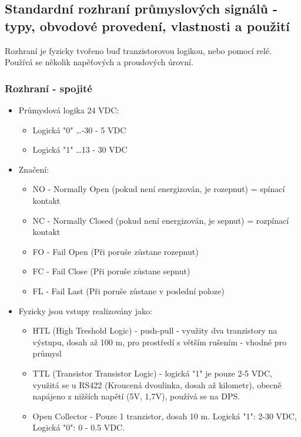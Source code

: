\subsection{Standardní rozhraní průmyslových signálů - typy, obvodové provedení, vlastnosti a použití}
Rozhraní je fyzicky tvořeno buď tranzistorovou logikou, nebo pomocí relé. Používá se několik napěťových a proudových úrovní.
\subsubsection*{Rozhraní - spojité}
\begin{itemize}
  \item Průmyslová logika 24 VDC: \begin{itemize}
    \item Logická "0" \dots -30 - 5 VDC
    \item Logická "1" \dots 13 - 30 VDC
  \end{itemize}
  \item Značení: \begin{itemize}
    \item NO - Normally Open (pokud není energizován, je rozepnut) = spínací kontakt
    \item NC - Normally Closed (pokud není energizován, je sepnut) = rozpínací kontakt
    \item FO - Fail Open (Při poruše zůstane rozepnut)
    \item FC - Fail Close (Při poruše zůstane sepnut)
    \item FL - Fail Last (Při poruše zůstane v poslední poloze)
  \end{itemize}
  	\item Fyzicky jsou vstupy realizovány jako: \begin{itemize}
      \item HTL (High Treshold Logic) - push-pull - využity dva tranzistory na výstupu, dosah až 100 m, pro prostředí s větším rušením - vhodné pro průmysl
      \item TTL (Transistor Transistor Logic) - logická "1" je pouze 2-5 VDC, využitá se u RS422 (Kroucená dvoulinka, dosah až kilometr), obecně napájeno z nižších napětí (5V, 1,7V), používá se na DPS.
      \item Open Collector - Pouze 1 tranzistor, dosah 10 m. Logická "1": 2-30 VDC, Logická "0": 0 - 0.5 VDC.
    \end{itemize}
  \end{itemize}
  
